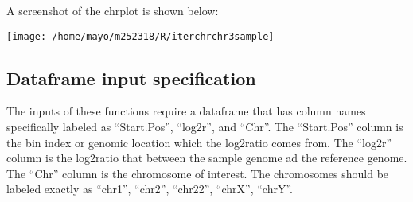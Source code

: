 \documentclass[
]{article}
\begin{document}
A screenshot of the chrplot is shown below:

\begin{center}\texttt{[image: /home/mayo/m252318/R/iterchrchr3sample]} \end{center}

\hypertarget{dataframe-input-specification}{%
\subsection{Dataframe input
specification}\label{dataframe-input-specification}}

The inputs of these functions require a dataframe that has column names
specifically labeled as ``Start.Pos'', ``log2r'', and ``Chr''. The
``Start.Pos'' column is the bin index or genomic location which the
log2ratio comes from. The ``log2r'' column is the log2ratio that between
the sample genome ad the reference genome. The ``Chr'' column is the
chromosome of interest. The chromosomes should be labeled exactly as
``chr1'', ``chr2'', ``chr22'', ``chrX'', ``chrY''.
\end{document}
